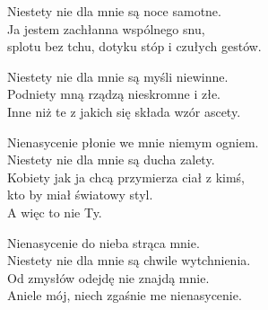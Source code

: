 \begin{text}
    Niestety nie dla mnie są noce samotne.\\
    Ja jestem zachłanna wspólnego snu,\\
    splotu bez tchu, dotyku stóp i czułych gestów.

    Niestety nie dla mnie są myśli niewinne.\\
    Podniety mną rządzą nieskromne i złe.\\
    Inne niż te z jakich się składa wzór ascety.

    Nienasycenie płonie we mnie niemym ogniem.\\
    Niestety nie dla mnie są ducha zalety.\\
    Kobiety jak ja chcą przymierza ciał z kimś,\\
    kto by miał światowy styl.\\
    A więc to nie Ty.

    Nienasycenie do nieba strąca mnie.\\
    Niestety nie dla mnie są chwile wytchnienia.\\
    Od zmysłów odejdę nie znajdą mnie.\\
    Aniele mój, niech zgaśnie me nienasycenie.
\end{text}
\begin{chord}

\end{chord}